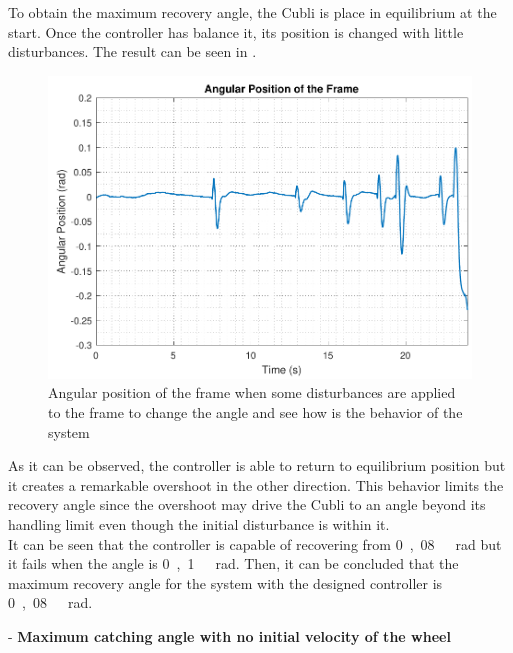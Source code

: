 To obtain the maximum recovery angle, the Cubli is place in equilibrium at the start. Once the controller has balance it, its position is changed with little disturbances. The result can be seen in .
%
\begin{figure}[H]
	\centering
	\includegraphics[scale=0.62]{figures/testRecovery}
	\caption{Angular position of the frame when some disturbances are applied to the frame to change the angle and see how is the behavior of the system}
	\label{testRecovery}
\end{figure}\vspace{-5mm}
%
As it can be observed, the controller is able to return to equilibrium position but it creates a remarkable overshoot in the other direction. This behavior limits the recovery angle since the overshoot may drive the Cubli to an angle beyond its handling limit even though the initial disturbance is within it.\\
It can be seen that the controller is capable of recovering from \si{0,08\ rad} but it fails when the angle is \si{0,1\ rad}. Then, it can be concluded that the maximum recovery angle for the system with the designed controller is \si{0,08\ rad}.

- \textbf{Maximum catching angle with no initial velocity of the wheel}

